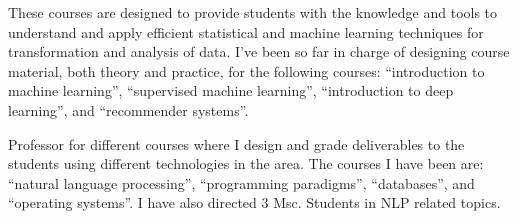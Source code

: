 \documentclass[]{deedy-resume-openfont}
\begin{document}
These courses are designed to provide students with the knowledge and tools 
to understand and apply efficient statistical and machine learning techniques
for transformation and analysis of data. I've been so far in charge of designing
course material, both theory and practice, for the following courses: 
``introduction to machine learning'', ``supervised machine learning'', 
``introduction to deep learning'', and ``recommender systems''.
\sectionsep

Professor for different courses where I design and grade deliverables to the
students using different technologies in the area. The courses I have been
are: ``natural language processing'', ``programming paradigms'', ``databases'', 
and ``operating systems''. I have also directed 3 Msc. Students in NLP related topics.
\sectionsep
\end{document}
